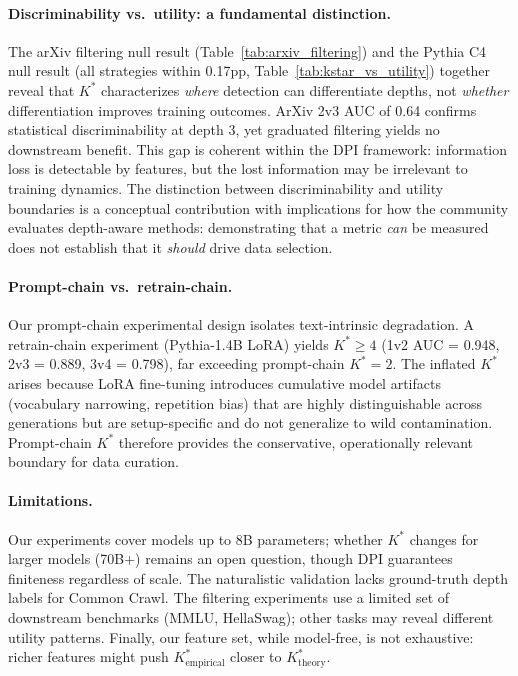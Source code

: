 \documentclass[11pt,a4paper]{article}
\begin{document}
\paragraph{Discriminability vs.\ utility: a fundamental distinction.}
The arXiv filtering null result (Table~\ref{tab:arxiv_filtering}) and the Pythia C4 null result (all strategies within 0.17pp, Table~\ref{tab:kstar_vs_utility}) together reveal that $K^*$ characterizes \emph{where} detection can differentiate depths, not \emph{whether} differentiation improves training outcomes. ArXiv 2v3 AUC of 0.64 confirms statistical discriminability at depth 3, yet graduated filtering yields no downstream benefit. This gap is coherent within the DPI framework: information loss is detectable by features, but the lost information may be irrelevant to training dynamics. The distinction between discriminability and utility boundaries is a conceptual contribution with implications for how the community evaluates depth-aware methods: demonstrating that a metric \emph{can} be measured does not establish that it \emph{should} drive data selection.

\paragraph{Prompt-chain vs.\ retrain-chain.}
Our prompt-chain experimental design isolates text-intrinsic degradation. A retrain-chain experiment (Pythia-1.4B LoRA) yields $K^* \geq 4$ (1v2 AUC = 0.948, 2v3 = 0.889, 3v4 = 0.798), far exceeding prompt-chain $K^*{=}2$. The inflated $K^*$ arises because LoRA fine-tuning introduces cumulative model artifacts (vocabulary narrowing, repetition bias) that are highly distinguishable across generations but are setup-specific and do not generalize to wild contamination. Prompt-chain $K^*$ therefore provides the conservative, operationally relevant boundary for data curation.

\paragraph{Limitations.}
Our experiments cover models up to 8B parameters; whether $K^*$ changes for larger models (70B+) remains an open question, though DPI guarantees finiteness regardless of scale. The naturalistic validation lacks ground-truth depth labels for Common Crawl. The filtering experiments use a limited set of downstream benchmarks (MMLU, HellaSwag); other tasks may reveal different utility patterns. Finally, our feature set, while model-free, is not exhaustive: richer features might push $K^*_{\text{empirical}}$ closer to $K^*_{\text{theory}}$.
\end{document}
